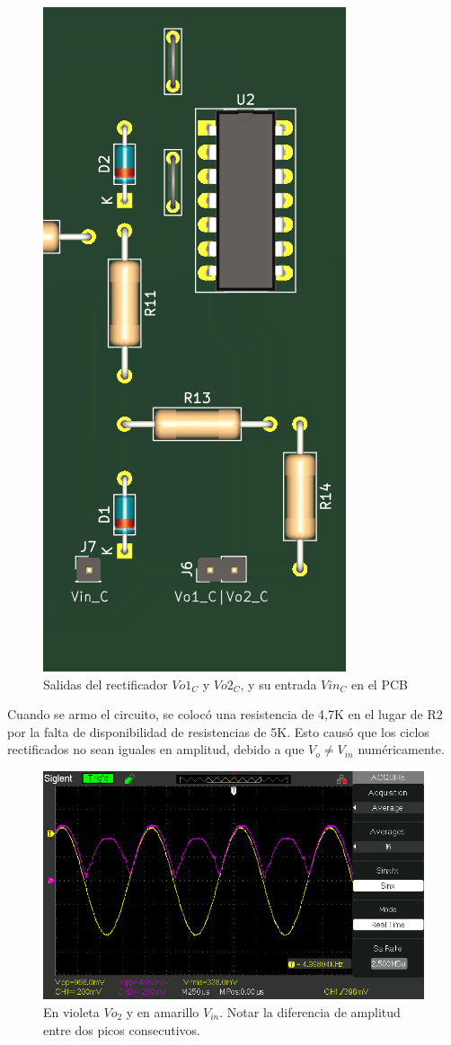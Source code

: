 \begin{figure}[H]
    \centering
    \includegraphics[width=0.5\linewidth]{Secciones//Circuito3/pcb3.png}
    \caption{Salidas del rectificador $Vo1_C$ y $Vo2_C$, y su entrada $Vin_C$ en el PCB}
    \label{fig:enter-label}
\end{figure}

Cuando se armo el circuito, se colocó una resistencia de 4,7K en el lugar de R2 por la falta de disponibilidad de resistencias de 5K. Esto causó que los ciclos rectificados no sean iguales en amplitud, debido a que $V_o \neq V_{in}$ numéricamente.

\begin{figure}[H]
    \centering
    \includegraphics[width=0.75\linewidth]{Secciones//Circuito4/osc4_1.jpg}
    \caption{En violeta $Vo_2$ y en amarillo $V_{in}$. Notar la diferencia de amplitud entre dos picos consecutivos.}
    \label{fig:enter-label}
\end{figure}


